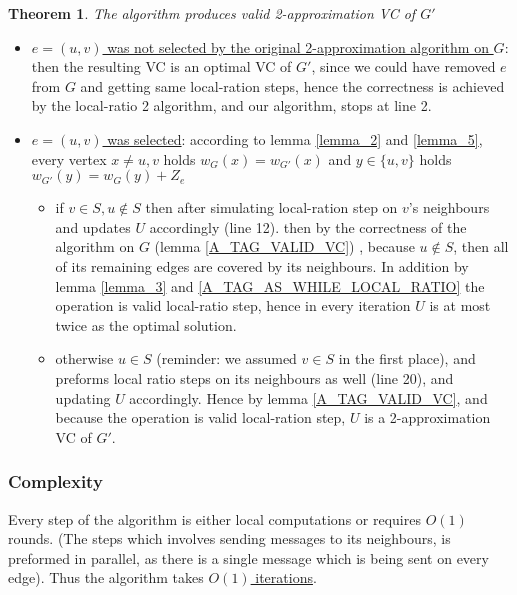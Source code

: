 \documentclass[11pt]{article}
\newtheorem{theorem}{Theorem}[section]
\begin{document}
\begin{theorem}
The algorithm produces valid 2-approximation VC of $G'$
\end{theorem}
\begin{itemize}
    \item \underline{$e=(u,v)$ was not selected by the original 2-approximation algorithm on $G$}: then the resulting VC is an optimal VC of $G'$, since we could have removed $e$ from $G$ and getting same local-ration steps, hence the correctness is achieved by the local-ratio 2 algorithm, and our algorithm, stops at line 2.
    \item \underline{$e=(u,v)$ was selected}: according to lemma \ref{lemma_2} and \ref{lemma_5}, every vertex $x \ne u,v$ holds $w_{G}(x)=w_{G'}(x)$ and $y \in \{u,v\}$ holds $w_{G'}(y)=w_G(y)+Z_e$
    \begin{itemize}
        \item if $v \in S, u\notin S$ then after simulating local-ration step on $v$'s neighbours and updates $U$ accordingly (line 12). then by the correctness of the algorithm on $G$ (lemma \ref{A_TAG_VALID_VC}) , because $u \notin S$, then all of its remaining edges are covered by its neighbours. In addition by lemma \ref{lemma_3} and \ref{A_TAG_AS_WHILE_LOCAL_RATIO} the operation is valid local-ratio step, hence in every iteration $U$ is at most twice as the optimal solution.
        \item otherwise $u \in S$ (reminder: we assumed $v \in S$ in the first place), and preforms local ratio steps on its neighbours as well (line 20), and updating $U$ accordingly. Hence by lemma \ref{A_TAG_VALID_VC}, and because the operation is valid local-ration step, $U$ is a 2-approximation VC of $G'$.
    \end{itemize}
\end{itemize}


\subsubsection*{Complexity}
Every step of the algorithm is either local computations or requires $O(1)$ rounds. (The steps which involves sending messages to its neighbours, is preformed in parallel, as there is a single message which is being sent on every edge). Thus the algorithm takes \underline{$O(1)$ iterations}.
\end{document}
